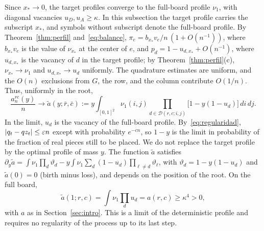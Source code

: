 Since $x_*\to0$, the target profiles converge to the full-board profile $\nu_1$, with diagonal vacancies
$u_D,u_A\ge\kappa$. In this
subsection the target profile carries the subscript $x_*$, and symbols without subscript denote the
full-board profile. By
Theorem~\ref{thm:perfil} and~\eqref{eq:balance}, $\pi_e=b_{x_*}v_e/n\,(1+O(n^{-1}))$, where $b_{x_*}v_e$ is
the value of
$\nu_{x_*}$ at the center of $e$, and $p_d=1-u_{d,x_*}+O(n^{-1})$, where $u_{d,x_*}$ is the vacancy of $d$
in the target profile; by
Theorem~\ref{thm:perfil}(c), $\nu_{x_*}\to\nu_1$ and $u_{d,x_*}\to u_d$ uniformly. The quadrature estimates
are uniform, and the $O(n)$ exclusions from $G$, the row, and the column contribute $O(1/n)$. Thus,
uniformly in the root,
\begin{equation}\label{eq:trayectoria}
 \frac{a_n^{rc}(y)}n\longrightarrow\tilde a(y;\bar r,\bar c):=
 y\int_{[0,1]^2}\nu_1(i,j)\prod_{d\in\mathcal D(r,c;i,j)}\bigl[1-y(1-u_d)\bigr]\,di\,dj .
\end{equation} In the limit, $u_d$ is the vacancy of the full-board profile. By~\eqref{eq:regularidad},
$|q_t-qz_t|\le\varepsilon n$ except
with probability $e^{-cn}$, so $1-y$ is the limit in probability of the fraction of real pieces still to be
placed. We do not replace the target profile
by the optimal profile of mass $y$. The function $\tilde a$ satisfies
$\partial_y\tilde a=\int\nu_1\prod_d\vartheta_d
-y\int\nu_1\sum_d(1-u_d)\prod_{\ell\ne d}\vartheta_\ell$, with $\vartheta_d=1-y(1-u_d)$ and $\tilde
a(0)=0$ (birth minus loss), and
depends on the position of the root. On the full board, \begin{equation}\label{eq:a_infinito}
 \tilde a(1;r,c)=\int\nu_1\prod_du_d=a(r,c)\ge\kappa^4>0,
\end{equation} with $a$ as in Section~\ref{sec:intro}. This is a limit of the deterministic profile and
requires no regularity of the
process up to its last step.
